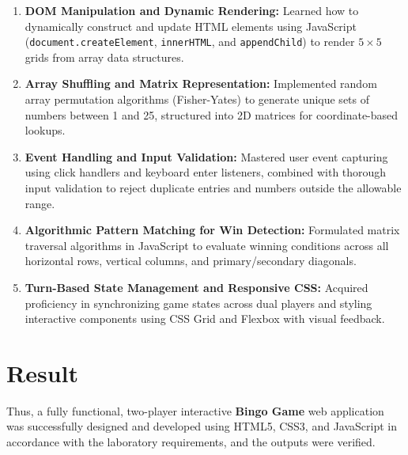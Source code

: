 \documentclass[11pt,a4paper]{article}
\begin{document}
\begin{enumerate}[leftmargin=*,itemsep=5pt]
    \item \textbf{DOM Manipulation and Dynamic Rendering:} 
    Learned how to dynamically construct and update HTML elements using JavaScript (\texttt{document.createElement}, \texttt{innerHTML}, and \texttt{appendChild}) to render $5 \times 5$ grids from array data structures.
    
    \item \textbf{Array Shuffling and Matrix Representation:} 
    Implemented random array permutation algorithms (Fisher-Yates) to generate unique sets of numbers between 1 and 25, structured into 2D matrices for coordinate-based lookups.
    
    \item \textbf{Event Handling and Input Validation:} 
    Mastered user event capturing using click handlers and keyboard enter listeners, combined with thorough input validation to reject duplicate entries and numbers outside the allowable range.
    
    \item \textbf{Algorithmic Pattern Matching for Win Detection:} 
    Formulated matrix traversal algorithms in JavaScript to evaluate winning conditions across all horizontal rows, vertical columns, and primary/secondary diagonals.
    
    \item \textbf{Turn-Based State Management and Responsive CSS:} 
    Acquired proficiency in synchronizing game states across dual players and styling interactive components using CSS Grid and Flexbox with visual feedback.
\end{enumerate}

\vspace{1.5em}
\section*{Result}
Thus, a fully functional, two-player interactive \textbf{Bingo Game} web application was successfully designed and developed using HTML5, CSS3, and JavaScript in accordance with the laboratory requirements, and the outputs were verified.
\end{document}
